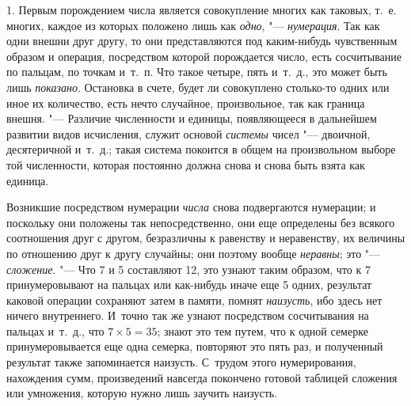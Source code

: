 1. Первым порождением числа является совокупление многих как таковых, т.~е.
многих, каждое из которых положено лишь как {\em одно},
"--- {\em нумерация}. Так как одни внешни друг другу, то
они представляются под каким-нибудь чувственным образом и операция,
посредством которой порождается число, есть сосчитывание по пальцам, по
точкам и~т.~п. Что такое четыре, пять и~т.~д., это может быть лишь
{\em показано}. Остановка в счете, будет ли совокуплено
столько-то одних или иное их количество, есть нечто случайное,
произвольное, так как граница внешня. "--- Различие численности и единицы,
появляющееся в дальнейшем развитии видов исчисления, служит основой
{\em системы} чисел "--- двоичной, десятеричной и~т.~д.;
такая система покоится в общем на произвольном выборе той численности,
которая постоянно должна снова и снова быть взята как единица.

Возникшие посредством нумерации {\em числа} снова
подвергаются нумерации; и поскольку они положены так непосредственно, они
еще определены без всякого соотношения друг с другом, безразличны к
равенству и неравенству, их величины по отношению друг к другу случайны;
они поэтому вообще {\em неравны}; это
"--- {\em сложение}. "--- Что 7 и 5 составляют 12, это узнают
таким образом, что к 7 принумеровывают на пальцах или как-нибудь иначе еще
5 одних, результат каковой операции сохраняют затем в памяти, помнят
{\em наизусть}, ибо здесь нет ничего внутреннего.
И~точно так же узнают посредством сосчитывания на пальцах и~т.~д., что
$7 \times 5 = 35$; знают это тем путем, что к одной семерке
принумеровывается еще
одна семерка, повторяют это пять раз, и полученный результат также
запоминается наизусть. С~трудом этого нумерирования, нахождения сумм,
произведений навсегда покончено готовой таблицей сложения или умножения,
которую нужно лишь заучить наизусть.

